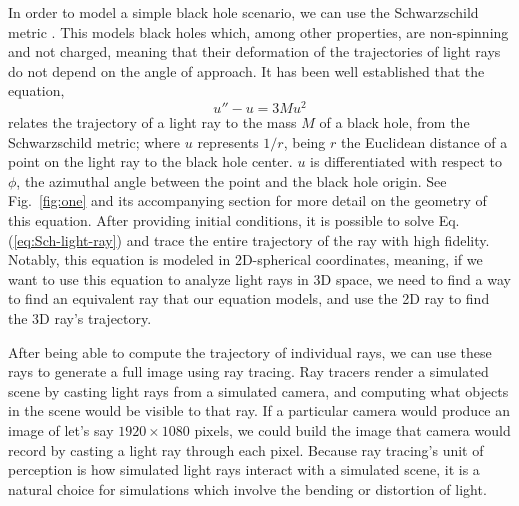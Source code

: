 In order to model a simple black hole scenario, we can use the Schwarzschild metric \cite{schw_soln-2007}.
This models black holes which, among other properties, are non-spinning and not charged,
meaning that their deformation of the trajectories of light rays do not depend on the angle of approach.
It has been well established \cite{gravitation-mtw} that the equation,
\begin{equation}
	u'' - u = 3 M u^2
	\label{eq:Sch-light-ray}
\end{equation}
relates the trajectory of a light ray to the mass $M$ of a black hole, from the Schwarzschild metric;
where $u$ represents $1/r$, being $r$ the Euclidean distance of a point on the light ray to the black hole center.
$u$ is differentiated with respect to $\phi$, the azimuthal angle between the point and the black hole origin.
See Fig.~\ref{fig:one} and its accompanying section for more detail on the geometry of this equation.
After providing initial conditions,  it is possible to solve Eq.(\ref{eq:Sch-light-ray}) and trace the entire trajectory of the ray with high fidelity.
Notably, this equation is modeled in 2D-spherical coordinates, meaning, if we want to use this equation to analyze light rays in 3D space, we need to find a way to find an equivalent ray that our equation models, and use the 2D ray to find the 3D ray's trajectory.

After being able to compute the trajectory of individual rays, we can use these rays to generate a full image using ray tracing. Ray tracers render a simulated scene by casting light rays from a simulated camera, and computing what objects in the scene would be visible to that ray. If a particular camera would produce an image of let's say $1920 \times 1080$ pixels, we could build the image that camera would record by casting a light ray through each pixel. Because ray tracing's unit of perception is how simulated light rays interact with a simulated scene, it is a natural choice for simulations which involve the bending or distortion of light.



